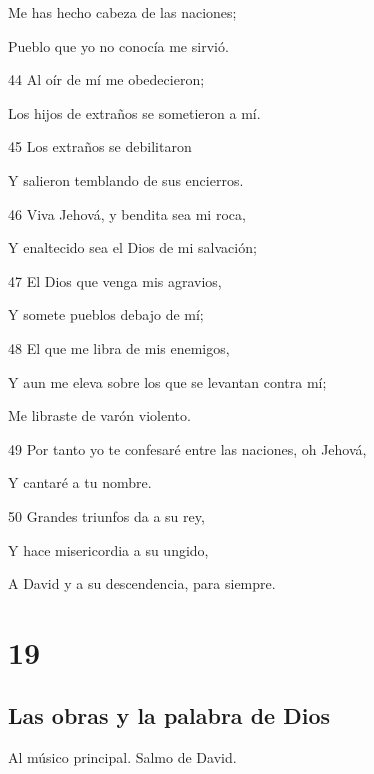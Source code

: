 \par Me has hecho cabeza de las naciones;
\par Pueblo que yo no conocía me sirvió.
\par 44 Al oír de mí me obedecieron;
\par Los hijos de extraños se sometieron a mí.
\par 45 Los extraños se debilitaron
\par Y salieron temblando de sus encierros.
\par 46 Viva Jehová, y bendita sea mi roca,
\par Y enaltecido sea el Dios de mi salvación;
\par 47 El Dios que venga mis agravios,
\par Y somete pueblos debajo de mí;
\par 48 El que me libra de mis enemigos,
\par Y aun me eleva sobre los que se levantan contra mí;
\par Me libraste de varón violento.
\par 49 Por tanto yo te confesaré entre las naciones, oh Jehová,
\par Y cantaré a tu nombre.
\par 50 Grandes triunfos da a su rey,
\par Y hace misericordia a su ungido,
\par A David y a su descendencia, para siempre.

\chapter{19}

\section*{Las obras y la palabra de Dios}

\par Al músico principal. Salmo de David.

